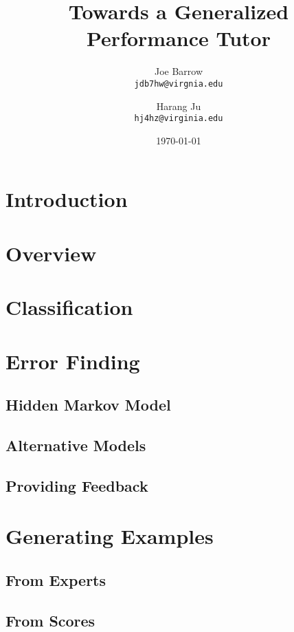 \documentclass[twocolumn]{article}
\title{Towards a Generalized Performance Tutor}
\author{
  Joe Barrow\\
  \texttt{jdb7hw@virgnia.edu}
  \and
  Harang Ju\\
  \texttt{hj4hz@virginia.edu}}
\date{\today}
\begin{document}
\maketitle

\begin{abstract}
\end{abstract}

\section{Introduction}

\section{Overview}

\section{Classification}

\section{Error Finding}

\subsection{Hidden Markov Model}

\subsection{Alternative Models}

\subsection{Providing Feedback}

\section{Generating Examples}

\subsection{From Experts}

\subsection{From Scores}
\end{document}
